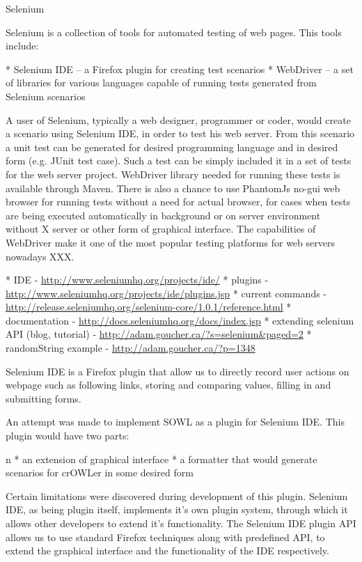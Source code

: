 \secc Selenium

Selenium is a collection of tools for automated testing of web pages. This tools include: 

\begitems
  * Selenium IDE -- a Firefox plugin for creating test scenarios
  * WebDriver -- a set of libraries for various languages capable of running
    tests generated from Selenium scenarios
\enditems

A user of Selenium, typically a web designer, programmer or coder, would create
a scenario using Selenium IDE, in order to test his web server. From this
scenario a unit test can be generated for desired programming language and in
desired form (e.g. JUnit test case). Such a test can be simply included it in a
set of tests for the web server project. WebDriver library needed for running
these tests is available through Maven. There is also a chance to use PhantomJs
no-gui web browser for running tests without a need for actual browser, for
cases when tests are being executed automatically in background or on server
environment without X server or other form of graphical interface. The
capabilities of WebDriver make it one of the most popular testing platforms for
web servers nowadays XXX. 

\begitems
  * IDE - \url{http://www.seleniumhq.org/projects/ide/}
  * plugins - \url{http://www.seleniumhq.org/projects/ide/plugins.jsp}
  * current commands - \url{http://release.seleniumhq.org/selenium-core/1.0.1/reference.html}
  * documentation - \url{http://docs.seleniumhq.org/docs/index.jsp}
  * extending selenium API (blog, tutorial) - \url{http://adam.goucher.ca/?s=selenium&paged=2}
  \begitems
    * randomString example - \url{http://adam.goucher.ca/?p=1348}
  \enditems
\enditems

Selenium IDE is a Firefox plugin that allow us to directly record user actions
on webpage such as following links, storing and comparing values, filling in
and submitting forms. 

An attempt was made to implement SOWL as a plugin for Selenium IDE. This plugin
would have two parts: 

\begitems \style n
  * an extension of graphical interface
  * a formatter that would generate scenarios for crOWLer in some desired form
\enditems

Certain limitations were discovered during development of this plugin.
Selenium IDE, as being plugin itself, implements it's own plugin system,
through which it allows other developers to extend it's functionality. The
Selenium IDE plugin API allows us to use standard Firefox techniques along with
predefined API, to extend the graphical interface and the functionality of the
IDE respectively. 

